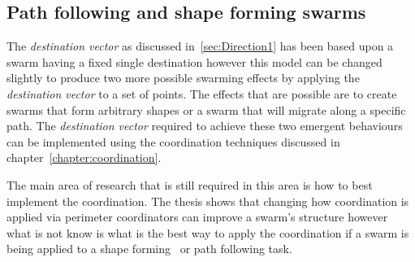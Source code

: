 \subsection{Path following and shape forming swarms}\label{sec:DirectionalShape1}
The \textit{destination vector} as discussed in~\autoref{sec:Direction1} has been based upon a swarm having a fixed single destination however this model can be changed slightly to produce two more possible swarming effects by applying the \textit{destination vector} to a set of points. The effects that are possible are to create swarms that form arbitrary shapes or a swarm that will migrate along a specific path. The \textit{destination vector} required to achieve these two emergent behaviours can be implemented using the coordination techniques discussed in chapter~\ref{chapter:coordination}.

The main area of research that is still required in this area is how to best implement the coordination. The thesis shows that changing how coordination is applied via perimeter coordinators can improve a swarm's structure however what is not know is what is the best way to apply the coordination if a swarm is being applied to a shape forming~\cite{EP:07} or path following task.
